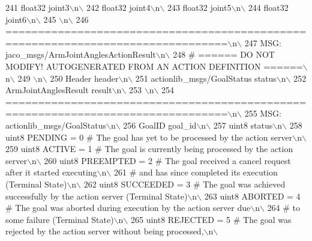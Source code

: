 \begin{DoxyCode}
241 \textcolor{stringliteral}{float32 joint3\(\backslash\)n\(\backslash\)}
242 \textcolor{stringliteral}{float32 joint4\(\backslash\)n\(\backslash\)}
243 \textcolor{stringliteral}{float32 joint5\(\backslash\)n\(\backslash\)}
244 \textcolor{stringliteral}{float32 joint6\(\backslash\)n\(\backslash\)}
245 \textcolor{stringliteral}{\(\backslash\)n\(\backslash\)}
246 \textcolor{stringliteral}{================================================================================\(\backslash\)n\(\backslash\)}
247 \textcolor{stringliteral}{MSG: jaco\_msgs/ArmJointAnglesActionResult\(\backslash\)n\(\backslash\)}
248 \textcolor{stringliteral}{# ====== DO NOT MODIFY! AUTOGENERATED FROM AN ACTION DEFINITION ======\(\backslash\)n\(\backslash\)}
249 \textcolor{stringliteral}{\(\backslash\)n\(\backslash\)}
250 \textcolor{stringliteral}{Header header\(\backslash\)n\(\backslash\)}
251 \textcolor{stringliteral}{actionlib\_msgs/GoalStatus status\(\backslash\)n\(\backslash\)}
252 \textcolor{stringliteral}{ArmJointAnglesResult result\(\backslash\)n\(\backslash\)}
253 \textcolor{stringliteral}{\(\backslash\)n\(\backslash\)}
254 \textcolor{stringliteral}{================================================================================\(\backslash\)n\(\backslash\)}
255 \textcolor{stringliteral}{MSG: actionlib\_msgs/GoalStatus\(\backslash\)n\(\backslash\)}
256 \textcolor{stringliteral}{GoalID goal\_id\(\backslash\)n\(\backslash\)}
257 \textcolor{stringliteral}{uint8 status\(\backslash\)n\(\backslash\)}
258 \textcolor{stringliteral}{uint8 PENDING         = 0   # The goal has yet to be processed by the action server\(\backslash\)n\(\backslash\)}
259 \textcolor{stringliteral}{uint8 ACTIVE          = 1   # The goal is currently being processed by the action server\(\backslash\)n\(\backslash\)}
260 \textcolor{stringliteral}{uint8 PREEMPTED       = 2   # The goal received a cancel request after it started executing\(\backslash\)n\(\backslash\)}
261 \textcolor{stringliteral}{                            #   and has since completed its execution (Terminal State)\(\backslash\)n\(\backslash\)}
262 \textcolor{stringliteral}{uint8 SUCCEEDED       = 3   # The goal was achieved successfully by the action server (Terminal State)\(\backslash\)n\(\backslash\)}
263 \textcolor{stringliteral}{uint8 ABORTED         = 4   # The goal was aborted during execution by the action server due\(\backslash\)n\(\backslash\)}
264 \textcolor{stringliteral}{                            #    to some failure (Terminal State)\(\backslash\)n\(\backslash\)}
265 \textcolor{stringliteral}{uint8 REJECTED        = 5   # The goal was rejected by the action server without being processed,\(\backslash\)n\(\backslash\)}

\end{DoxyCode}
